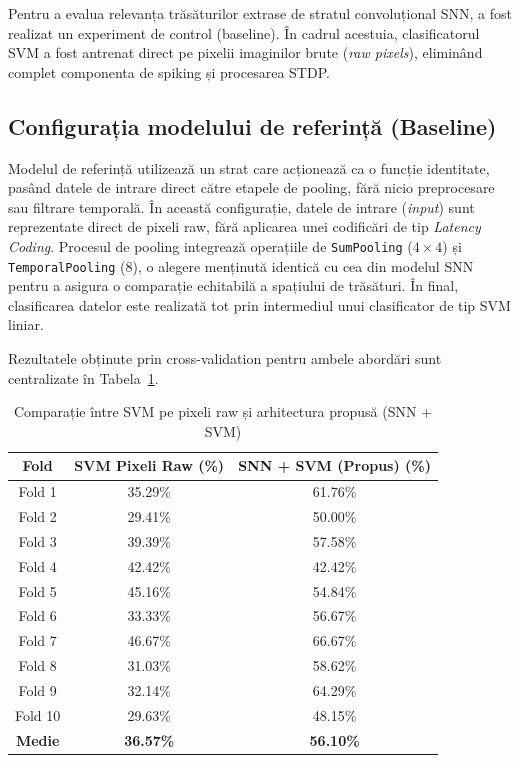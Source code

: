 Pentru a evalua relevanța trăsăturilor extrase de stratul convoluțional SNN, a fost realizat un experiment de control (baseline). În cadrul acestuia, clasificatorul SVM a fost antrenat direct pe pixelii imaginilor brute (\textit{raw pixels}), eliminând complet componenta de spiking și procesarea STDP.

\subsection*{Configurația modelului de referință (Baseline)}
Modelul de referință utilizează un strat care acționează ca o funcție identitate, pasând datele de intrare direct către etapele de pooling, fără nicio preprocesare sau filtrare temporală. În această configurație, datele de intrare (\textit{input}) sunt reprezentate direct de pixeli raw, fără aplicarea unei codificări de tip \textit{Latency Coding}. Procesul de pooling integrează operațiile de \texttt{SumPooling} ($4 \times 4$) și \texttt{TemporalPooling} (8), o alegere menținută identică cu cea din modelul SNN pentru a asigura o comparație echitabilă a spațiului de trăsături. În final, clasificarea datelor este realizată tot prin intermediul unui clasificator de tip SVM liniar.

Rezultatele obținute prin cross-validation pentru ambele abordări sunt centralizate în Tabela~\ref{tab:comparatie_rezultate}.

\begin{table}[h!]
	\centering
	\caption{Comparație între SVM pe pixeli raw și arhitectura propusă (SNN + SVM)}
	\label{tab:comparatie_rezultate}
	\begin{tabular}{@{}ccc@{}}
		\toprule
		\textbf{Fold} & \textbf{SVM Pixeli Raw (\%)} & \textbf{SNN + SVM (Propus) (\%)} \\ \midrule
		Fold 1  & 35.29\% & 61.76\% \\
		Fold 2  & 29.41\% & 50.00\% \\
		Fold 3  & 39.39\% & 57.58\% \\
		Fold 4  & 42.42\% & 42.42\% \\
		Fold 5  & 45.16\% & 54.84\% \\
		Fold 6  & 33.33\% & 56.67\% \\
		Fold 7  & 46.67\% & 66.67\% \\
		Fold 8  & 31.03\% & 58.62\% \\
		Fold 9  & 32.14\% & 64.29\% \\
		Fold 10 & 29.63\% & 48.15\% \\ \midrule
		\textbf{Medie} & \textbf{36.57\%} & \textbf{56.10\%} \\ \bottomrule
	\end{tabular}
\end{table}

